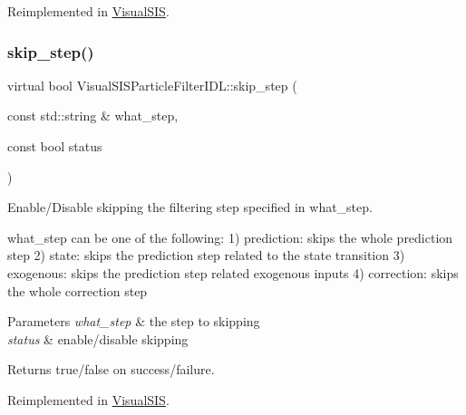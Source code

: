 Reimplemented in \hyperlink{classVisualSIS_a08aa7928cccabd93a1907cb540863cda}{Visual\+S\+IS}.

\mbox{\label{classVisualSISParticleFilterIDL_a09d343c25082f2056546c6e95d397eaf}} 
\subsubsection{\texorpdfstring{skip\+\_\+step()}{skip\_step()}}
{\footnotesize\ttfamily virtual bool Visual\+S\+I\+S\+Particle\+Filter\+I\+D\+L\+::skip\+\_\+step (\begin{DoxyParamCaption}\item[{const std\+::string \&}]{what\+\_\+step,  }\item[{const bool}]{status }\end{DoxyParamCaption})\hspace{0.3cm}{\ttfamily [virtual]}}



Enable/\+Disable skipping the filtering step specified in what\+\_\+step. 

what\+\_\+step can be one of the following\+: 1) prediction\+: skips the whole prediction step 2) state\+: skips the prediction step related to the state transition 3) exogenous\+: skips the prediction step related exogenous inputs 4) correction\+: skips the whole correction step 
\begin{DoxyParams}{Parameters}
{\em what\+\_\+step} & the step to skipping \\
\hline
{\em status} & enable/disable skipping \\
\hline
\end{DoxyParams}
\begin{DoxyReturn}{Returns}
true/false on success/failure. 
\end{DoxyReturn}


Reimplemented in \hyperlink{classVisualSIS_ac9905862d7198c5ae80f7e682500c608}{Visual\+S\+IS}.

\mbox{\label{classVisualSISParticleFilterIDL_a8a30501c75b4c7152a2abff96a950b63}} 

